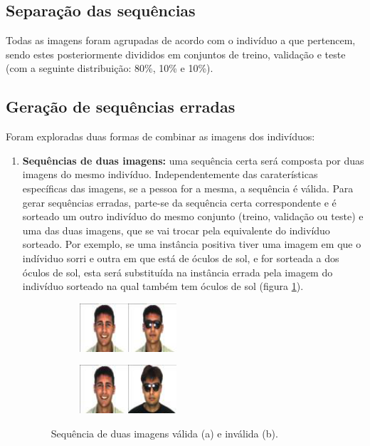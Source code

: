 \subsection{Separação das sequências}
\label{chap4:subsec:separacao}
Todas as imagens foram agrupadas de acordo com o indivíduo a que pertencem, sendo estes posteriormente divididos em conjuntos de treino, validação e teste (com a seguinte distribuição: 80\%, 10\% e 10\%).

\subsection{Geração de sequências erradas}
\label{chap4:subsec:erradas}

Foram exploradas duas formas de combinar as imagens dos indivíduos:

\begin{enumerate}
    \item \textbf{Sequências de duas imagens:} uma sequência certa será composta por duas imagens do mesmo indivíduo. Independentemente das caraterísticas específicas das imagens, se a pessoa for a mesma, a sequência é válida. \newline
    \noindent Para gerar sequências erradas, parte-se da sequência certa correspondente e é sorteado um outro indivíduo do mesmo conjunto (treino, validação ou teste) e uma das duas imagens, que se vai trocar pela equivalente do indivíduo sorteado. Por exemplo, se uma instância positiva tiver uma imagem em que o indíviduo sorri e outra em que está de óculos de sol, e for sorteada a dos óculos de sol, esta será substituída na instância errada pela imagem do indivíduo sorteado na qual também tem óculos de sol (figura \ref{fig:trocas2}).

    \begin{figure}[h]
      \centering
      \begin{subfigure}{3.6cm}
        \centering\includegraphics[width=3.6cm]{seq_certa.png}
        \caption{}
      \end{subfigure}
      \hspace{1em}
      \begin{subfigure}{3.6cm}
        \centering\includegraphics[width=3.6cm]{seq_errada.png}
        \caption{}
      \end{subfigure}
      \caption{Sequência de duas imagens válida (a) e inválida (b).}
      \label{fig:trocas2}
    \end{figure}
    

\end{enumerate}
